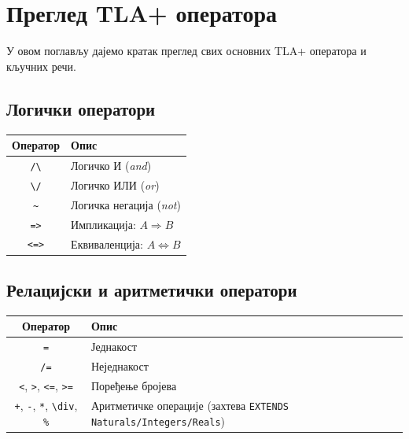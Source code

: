 \section{Преглед TLA+ оператора}

У овом поглављу дајемо кратак преглед свих основних TLA+ оператора и кључних речи.

\subsection{Логички оператори}
\begin{center}
\begin{tabularx}{\textwidth}{|c|X|}
\hline
\textbf{Оператор} & \textbf{Опис} \\
\hline
\texttt{/\textbackslash} & Логичко И (\textit{and}) \\
\texttt{\textbackslash/} & Логичко ИЛИ (\textit{or}) \\
\texttt{\textasciitilde} & Логичка негација (\textit{not}) \\
\texttt{=>}             & Импликација: $A \Rightarrow B$ \\
\texttt{<=>}            & Еквиваленција: $A \Leftrightarrow B$ \\
\hline
\end{tabularx}
\end{center}

\subsection{Релацијски и аритметички оператори}
\begin{center}
\begin{tabularx}{\textwidth}{|c|X|}
\hline
\textbf{Оператор} & \textbf{Опис} \\
\hline
\texttt{=}   & Једнакост \\
\texttt{/=}  & Неједнакост \\
\texttt{<}, \texttt{>}, \texttt{<=}, \texttt{>=} & Поређење бројева \\
\texttt{+}, \texttt{-}, \texttt{*}, \texttt{\textbackslash div}, \texttt{\%} & Аритметичке операције (захтева \texttt{EXTENDS Naturals/Integers/Reals}) \\
\hline
\end{tabularx}
\end{center}

